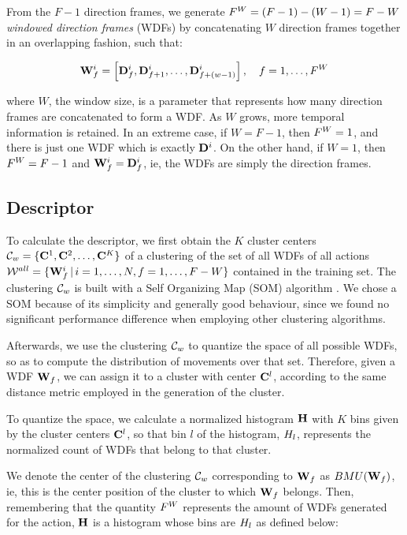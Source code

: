 \documentclass{fcs}
\begin{document}
From the $F-1$ direction frames, we generate $F^W=(F-1)-(W-1)=F-W$ \textit{windowed direction frames} (WDFs) by concatenating $W$ direction frames together in an overlapping fashion, such that:

\begin{equation}
\label{window} 
\mathbf{W}_f^i = \left[ \mathbf{D}_f^i, \mathbf{D}_{f+1}^i, \dots, \mathbf{D}_{f+(w-1)}^i \right], \quad f=1,\dots,F^W
\end{equation}

where $W$, the window size, is a parameter that represents how many direction frames are concatenated to form a WDF. As $W$ grows, more temporal information is retained. In an extreme case, if $W=F-1$, then $F^W=1$, and there is just one WDF which is exactly $\mathbf{D}^i$. On the other hand, if $W=1$, then $F^W= F-1$ and $\mathbf{W}_f^i=\mathbf{D}_f^i$, ie, the WDFs are simply the direction frames.


\subsection{Descriptor}


To calculate the descriptor, we first obtain the $K$ cluster centers $\mathcal{C}_w = \{ \mathbf{C}^{1},\mathbf{C}^{2},\dots,\mathbf{C}^{K}\}$ of a clustering of the set of all WDFs of all actions $\mathcal{W}^{all} = \{  \mathbf{W}_f^i \, | \, i=1,\dots,N, f=1,\dots,F-W \}$ contained in the training set. The clustering $\mathcal{C}_w$ is built with a Self Organizing Map (SOM) algorithm \cite{kohonen2001self}. We chose a SOM because of its simplicity and generally good behaviour, since we found no significant performance difference when employing other clustering algorithms.

Afterwards, we use the clustering $\mathcal{C}_w$ to quantize the space of all possible WDFs, so as to compute the distribution of movements over that set. Therefore, given a  WDF $\mathbf{W}_f$, we can assign it to a cluster with center $\mathbf{C}^{l}$, according to the same distance metric employed in the generation of the cluster. 

To quantize the space, we calculate a normalized histogram $\mathbf{H}$ with $K$ bins given by the cluster centers $\mathbf{C}^{l}$, so that bin $l$ of the histogram, $H_l$, represents the normalized count of WDFs that belong to that cluster.

We denote the center of the clustering $\mathcal{C}_w$ corresponding to $\mathbf{W}_f$ as $BMU(\mathbf{W}_f)$, ie, this is the center position of the cluster to which $\mathbf{W}_f$ belongs. Then, remembering that the quantity $F^W$ represents the amount of WDFs generated for the action, $\mathbf{H}$ is a histogram whose bins are $H_l$ as defined below:
\end{document}
